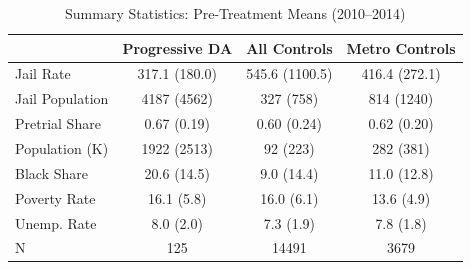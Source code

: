 \begin{table}[ht]
\centering
\begin{tabular}{lccc}
  \toprule
 & Progressive DA & All Controls & Metro Controls \\ 
  \midrule
Jail Rate & 317.1 (180.0) & 545.6 (1100.5) & 416.4 (272.1) \\ 
  Jail Population & 4187 (4562) & 327 (758) & 814 (1240) \\ 
  Pretrial Share & 0.67 (0.19) & 0.60 (0.24) & 0.62 (0.20) \\ 
  Population (K) & 1922 (2513) & 92 (223) & 282 (381) \\ 
  Black Share & 20.6 (14.5) & 9.0 (14.4) & 11.0 (12.8) \\ 
  Poverty Rate & 16.1 (5.8) & 16.0 (6.1) & 13.6 (4.9) \\ 
  Unemp. Rate & 8.0 (2.0) & 7.3 (1.9) & 7.8 (1.8) \\ 
  N &   125 & 14491 &  3679 \\ 
   \bottomrule
\end{tabular}
\caption{Summary Statistics: Pre-Treatment Means (2010--2014)} 
\label{tab:summary}
\end{table}
